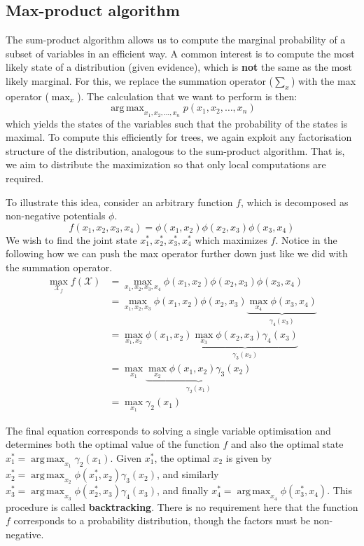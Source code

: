 \documentclass{article}
\DeclareMathOperator*{\argmax}{arg\,max}
\begin{document}
\subsection{Max-product algorithm}

The sum-product algorithm allows us to compute the marginal probability of a subset of variables in an efficient way. A common interest is to compute the most likely state of a distribution (given evidence), which is \textbf{not} the same as the most likely marginal. For this, we replace the summation operator ($\sum_x$) with the max operator ($\max_x$). The calculation that we want to perform is then:
$$
    \argmax_{x_1, x_2, \dots, x_n} p(x_1, x_2, \dots, x_n)
$$
\noindent which yields the states of the variables such that the probability of the states is maximal. To compute this efficiently for trees, we again exploit any factorisation structure of the distribution, analogous to the sum-product algorithm. That is, we aim to distribute the maximization so that only local computations are required. 

To illustrate this idea, consider an arbitrary function $f$, which is decomposed as non-negative potentials $\phi$. 
$$
    f(x_1, x_2, x_3, x_4) = \phi(x_1, x_2)\phi(x_2, x_3)\phi(x_3, x_4)
$$
\noindent We wish to find the joint state $x_1^*, x_2^*, x_3^*, x_4^*$ which maximizes $f$. Notice in the following how we can push the max operator further down just like we did with the summation operator. 
\begin{align*}
    \max_{\mathcal{X}_f} f(\mathcal{X}) &= \max_{x_1, x_2, x_3, x_4} \phi(x_1, x_2)\phi(x_2, x_3)\phi(x_3, x_4)\\
    &= \max_{x_1, x_2, x_3} \phi(x_1, x_2)\phi(x_2, x_3) \underbrace{ \max_{x_4} \phi(x_3, x_4)}_{\gamma_4(x_3)}\\
    &= \max_{x_1, x_2} \phi(x_1, x_2) \underbrace{ \max_{x_3} \phi(x_2, x_3) \gamma_4(x_3)}_{\gamma_3(x_2)}\\
    &= \max_{x_1} \underbrace{ \max_{x_2} \phi(x_1, x_2) \gamma_3(x_2)}_{\gamma_2(x_1)}\\
    &= \max_{x_1} \gamma_2(x_1)
\end{align*}

\noindent The final equation corresponds to solving a single variable optimisation and determines both the optimal value of the function $f$ and also the optimal state $x_1^* = \argmax_{x_1} \gamma_2(x_1)$. Given $x_1^*$, the optimal $x_2$ is given by $x_2^* = \argmax_{x_2} \phi(x_1^*, x_2) \gamma_3(x_2)$, and similarly $x_3^* = \argmax_{x_3} \phi(x_2^*, x_3) \gamma_4(x_3)$, and finally $x_4^* = \argmax_{x_4} \phi(x_3^*, x_4)$. This procedure is called \textbf{backtracking}. There is no requirement here that the function $f$ corresponds to a probability distribution, though the factors must be non-negative. 
\end{document}
